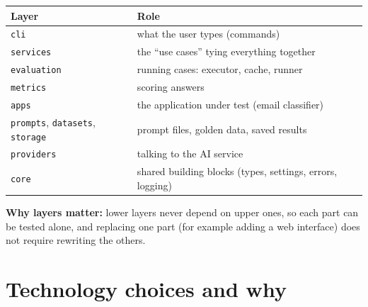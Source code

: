 \documentclass[11pt,a4paper]{article}
\newcommand{\code}[1]{\nolinkurl{#1}}
\begin{document}
\begin{center}
\begin{tabular}{@{}ll@{}}
\toprule
\textbf{Layer} & \textbf{Role} \\
\midrule
\code{cli} & what the user types (commands) \\
\code{services} & the ``use cases'' tying everything together \\
\code{evaluation} & running cases: executor, cache, runner \\
\code{metrics} & scoring answers \\
\code{apps} & the application under test (email classifier) \\
\code{prompts}, \code{datasets}, \code{storage} & prompt files, golden data, saved results \\
\code{providers} & talking to the AI service \\
\code{core} & shared building blocks (types, settings, errors, logging) \\
\bottomrule
\end{tabular}
\end{center}

\textbf{Why layers matter:} lower layers never depend on upper ones, so each part can be
tested alone, and replacing one part (for example adding a web interface) does not require
rewriting the others.

\section{Technology choices and why}
\end{document}
